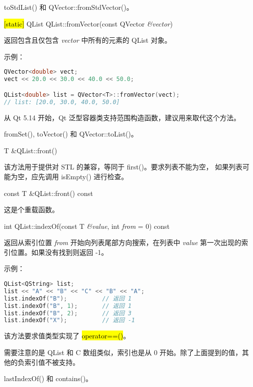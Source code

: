 \begin{notice}[另请参阅]
toStdList() 和 QVector::fromStdVector()。
\end{notice}


\hl{[static]} QList QList::fromVector(const QVector \emph{\&vector})

返回包含且仅包含 \emph{vector} 中所有的元素的 QList 对象。

示例：


\begin{lstlisting}[language=C++]
QVector<double> vect;
vect << 20.0 << 30.0 << 40.0 << 50.0;

QList<double> list = QVector<T>::fromVector(vect);
// list: [20.0, 30.0, 40.0, 50.0]
\end{lstlisting}


\begin{notice}
从 Qt 5.14 开始，Qt 泛型容器类支持范围构造函数，建议用来取代这个方法。
\end{notice}


\begin{notice}[另请参阅]
fromSet(), toVector() 和 QVector::toList()。
\end{notice}

T \&QList::front()

该方法用于提供对 STL 的兼容，等同于 first()。要求列表不能为空， 如果列表可能为空，应先调用 isEmpty() 进行检查。

const T \&QList::front() const

这是个重载函数。

int QList::indexOf(const T \emph{\&value}, int \emph{from} = 0) const

返回从索引位置 \emph{from} 开始向列表尾部方向搜索，在列表中 \emph{value} 第一次出现的索引位置。如果没有找到则返回 -1。

示例：



\begin{lstlisting}[language=C++]
QList<QString> list;
list << "A" << "B" << "C" << "B" << "A";
list.indexOf("B");          // 返回 1
list.indexOf("B", 1);       // 返回 1
list.indexOf("B", 2);       // 返回 3
list.indexOf("X");          // 返回 -1
\end{lstlisting}



该方法要求值类型实现了 \hl{operator==()}。

需要注意的是 QList 和 C 数组类似，索引也是从 0 开始。除了上面提到的值，其他的负索引值不被支持。

\begin{notice}[另请参阅]
lastIndexOf() 和 contains()。
\end{notice}

